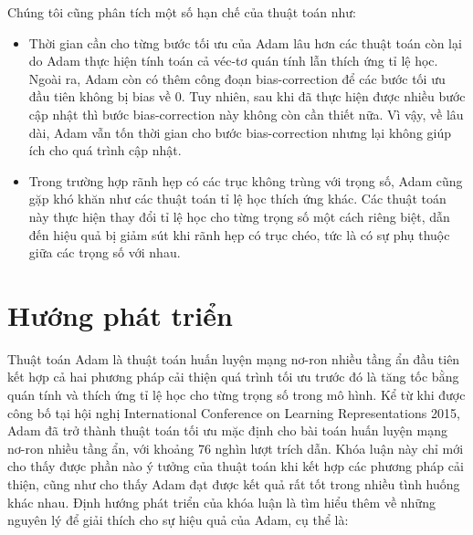 Chúng tôi cũng phân tích một số hạn chế của thuật toán như:

\begin{itemize}
	\item Thời gian cần cho từng bước tối ưu của Adam lâu hơn các thuật toán còn lại do Adam thực hiện tính toán cả véc-tơ quán tính lẫn thích ứng tỉ lệ học. Ngoài ra, Adam còn có thêm công đoạn bias-correction để các bước tối ưu đầu tiên không bị bias về 0. Tuy nhiên, sau khi đã thực hiện được nhiều bước cập nhật thì bước bias-correction này không còn cần thiết nữa. Vì vậy, về lâu dài, Adam vẫn tốn thời gian cho bước bias-correction nhưng lại không giúp ích cho quá trình cập nhật.
	\item Trong trường hợp rãnh hẹp có các trục không trùng với trọng số, Adam cũng gặp khó khăn như các thuật toán tỉ lệ học thích ứng khác. Các thuật toán này thực hiện thay đổi tỉ lệ học cho từng trọng số một cách riêng biệt, dẫn đến hiệu quả bị giảm sút khi rãnh hẹp có trục chéo, tức là có sự phụ thuộc giữa các trọng số với nhau.
\end{itemize}

\section{Hướng phát triển}

Thuật toán Adam là thuật toán huấn luyện mạng nơ-ron nhiều tầng ẩn đầu tiên kết hợp cả hai phương pháp cải thiện quá trình tối ưu trước đó là tăng tốc bằng quán tính và thích ứng tỉ lệ học cho từng trọng số trong mô hình. Kể từ khi được công bố tại hội nghị International Conference on Learning Representations 2015, Adam đã trở thành thuật toán tối ưu mặc định cho bài toán huấn luyện mạng nơ-ron nhiều tầng ẩn, với khoảng 76 nghìn lượt trích dẫn. Khóa luận này chỉ mới cho thấy được phần nào ý tưởng của thuật toán khi kết hợp các phương pháp cải thiện, cũng như cho thấy Adam đạt được kết quả rất tốt trong nhiều tình huống khác nhau. Định hướng phát triển của khóa luận là tìm hiểu thêm về những nguyên lý để giải thích cho sự hiệu quả của Adam, cụ thể là:

